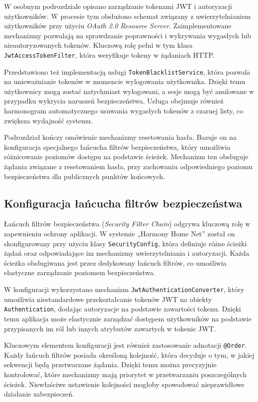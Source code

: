 W osobnym podrozdziale opisano zarządzanie tokenami JWT i autoryzacji użytkowników. W procesie tym obsłużono schemat związany z uwierzytelnianiem użytkowników przy użyciu \emph{OAuth 2.0 Resource Server}. Zaimplementowane mechanizmy pozwalają na sprawdzanie poprawności i wykrywania wygasłych lub nieautoryzowanych tokenów. Kluczową rolę pełni w tym klasa \texttt{JwtAccessTokenFilter}, która weryfikuje tokeny w żądaniach HTTP.

Przedstawiono też implementacją usługi \texttt{TokenBlacklistService}, która pozwala na unieważnianie tokenów w momencie wylogowania użytkownika. Dzięki temu użytkownicy mogą zostać natychmiast wylogowani, a sesje mogą być anulowane w przypadku wykrycia naruszeń bezpieczeństwa. Usługa obejmuje również harmonogram automatycznego usuwania wygasłych tokenów z czarnej listy, co zwiększa wydajność systemu.

Podrozdział kończy omówienie mechanizmy resetowania hasła. Bazuje on na konfiguracja specjalnego łańcucha filtrów bezpieczeństwa, który umożliwia różnicowanie poziomów dostępu na podstawie ścieżek. Mechanizm ten obsługuje żądania związane z resetowaniem hasła, przy zachowaniu odpowiedniego poziomu bezpieczeństwa dla publicznych punktów końcowych.


\subsection{Konfiguracja łańcucha filtrów bezpieczeństwa}
Łańcuch filtrów bezpieczeństwa (\emph{Security Filter Chain}) odgrywa kluczową rolę w zapewnieniu ochrony aplikacji. W systemie „Harmony Home Net” został on skonfigurowany przy użyciu klasy \texttt{SecurityConfig}, która definiuje różne ścieżki żądań oraz odpowiadające im mechanizmy uwierzytelniania i autoryzacji. Każda ścieżka obsługiwana jest przez dedykowany łańcuch filtrów, co umożliwia elastyczne zarządzanie poziomem bezpieczeństwa.

W konfiguracji wykorzystano mechanizm \texttt{JwtAuthenticationConverter}, który umożliwia niestandardowe przekształcanie tokenów JWT na obiekty \texttt{Authentication}, dodając autoryzacje na podstawie zawartości tokenu. Dzięki temu aplikacja może elastycznie zarządzać dostępem użytkowników na podstawie przypisanych im ról lub innych atrybutów zawartych w tokenie JWT.

Kluczowym elementem konfiguracji jest również zastosowanie adnotacji \texttt{@Order}. Każdy łańcuch filtrów posiada określoną kolejność, która decyduje o tym, w jakiej sekwencji będą przetwarzane żądania. Dzięki temu można precyzyjnie kontrolować, które mechanizmy mają priorytet w przetwarzaniu poszczególnych ścieżek. Niewłaściwe ustawienie kolejności mogłoby spowodować nieprawidłowe działanie zabezpieczeń.

